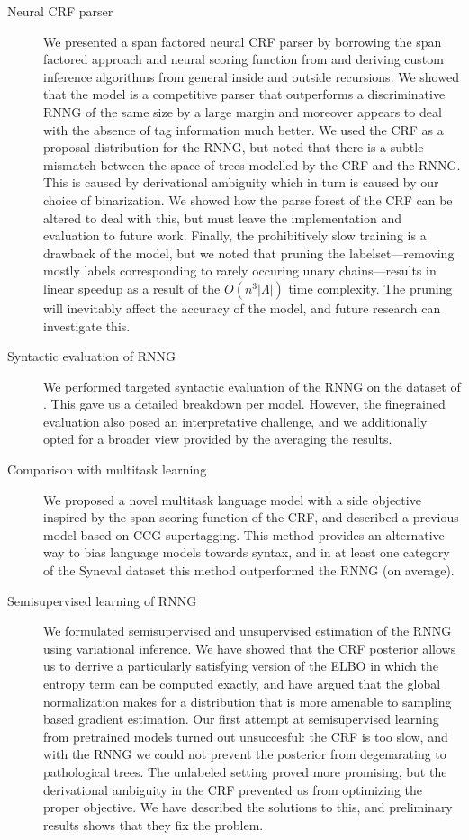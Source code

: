   \begin{description}
    \item[Neural CRF parser]
      We presented a span factored neural CRF parser by borrowing the span factored approach and neural scoring function from \cite{stern2017minimal} and deriving custom inference algorithms from general inside and outside recursions. We showed that the model is a competitive parser that outperforms a discriminative RNNG of the same size by a large margin and moreover appears to deal with the absence of tag information much better. We used the CRF as a proposal distribution for the RNNG, but noted that there is a subtle mismatch between the space of trees modelled by the CRF and the RNNG. This is caused by derivational ambiguity which in turn is caused by our choice of binarization. We showed how the parse forest of the CRF can be altered to deal with this, but must leave the implementation and evaluation to future work. Finally, the prohibitively slow training is a drawback of the model, but we noted that pruning the labelset---removing mostly labels corresponding to rarely occuring unary chains---results in linear speedup as a result of the $O(n^3 \lvert \Lambda \rvert)$ time complexity. The pruning will inevitably affect the accuracy of the model, and future research can investigate this.

    \item[Syntactic evaluation of RNNG]
      We performed targeted syntactic evaluation of the RNNG on the dataset of \citet{linzen2018targeted}. This gave us a detailed breakdown per model. However, the finegrained evaluation also posed an interpretative challenge, and we additionally opted for a broader view provided by the averaging the results.

    \item[Comparison with multitask learning]
      We proposed a novel multitask language model with a side objective inspired by the span scoring function of the CRF, and described a previous model based on CCG supertagging. This method provides an alternative way to bias language models towards syntax, and in at least one category of the Syneval dataset this method outperformed the RNNG (on average).

    \item[Semisupervised learning of RNNG]
      We formulated semisupervised and unsupervised estimation of the RNNG using variational inference. We have showed that the CRF posterior allows us to derrive a particularly satisfying version of the ELBO in which the entropy term can be computed exactly, and have argued that the global normalization makes for a distribution that is more amenable to sampling based gradient estimation. Our first attempt at semisupervised learning from pretrained models turned out unsuccesful: the CRF is too slow, and with the RNNG we could not prevent the posterior from degenarating to pathological trees. The unlabeled setting proved more promising, but the derivational ambiguity in the CRF prevented us from optimizing the proper objective. We have described the solutions to this, and preliminary results shows that they fix the problem.

  \end{description}

